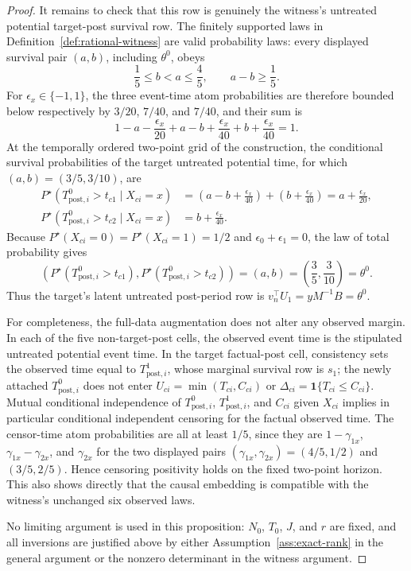 \documentclass{article}
\begin{document}
\begin{proof}
It remains to check that this row is genuinely the witness's untreated potential target-post survival row.  The finitely supported laws in Definition~\ref{def:rational-witness} are valid probability laws: every displayed survival pair \((a,b)\), including \(\theta^0\), obeys
\[
\frac15\le b<a\le\frac45,
\qquad a-b\ge\frac15.
\]
For \(\epsilon_x\in\{-1,1\}\), the three event-time atom probabilities are therefore bounded below respectively by \(3/20\), \(7/40\), and \(7/40\), and their sum is
\[
1-a-\frac{\epsilon_x}{20}
+a-b+\frac{\epsilon_x}{40}
+b+\frac{\epsilon_x}{40}=1.
\]
At the temporally ordered two-point grid of the construction, the conditional survival probabilities of the target untreated potential time, for which \((a,b)=(3/5,3/10)\), are
\[
\begin{aligned}
P^\star\!\left(T^0_{\mathrm{post},i}>t_{c1}\mid X_{ci}=x\right)
&=\left(a-b+\frac{\epsilon_x}{40}\right)
+\left(b+\frac{\epsilon_x}{40}\right)
=a+\frac{\epsilon_x}{20},\\
P^\star\!\left(T^0_{\mathrm{post},i}>t_{c2}\mid X_{ci}=x\right)
&=b+\frac{\epsilon_x}{40}.
\end{aligned}
\]
Because \(P^\star(X_{ci}=0)=P^\star(X_{ci}=1)=1/2\) and \(\epsilon_0+\epsilon_1=0\), the law of total probability gives
\[
\left(
P^\star(T^0_{\mathrm{post},i}>t_{c1}),
P^\star(T^0_{\mathrm{post},i}>t_{c2})
\right)
=(a,b)
=\left(\frac35,\frac3{10}\right)
=\theta^0.
\]
Thus the target's latent untreated post-period row is \(v_n^\top U_1=yM^{-1}B=\theta^0\).

For completeness, the full-data augmentation does not alter any observed margin.  In each of the five non-target-post cells, the observed event time is the stipulated untreated potential event time.  In the target factual-post cell, consistency sets the observed time equal to \(T^1_{\mathrm{post},i}\), whose marginal survival row is \(s_1\); the newly attached \(T^0_{\mathrm{post},i}\) does not enter \(U_{ci}=\min(T_{ci},C_{ci})\) or \(\Delta_{ci}=\mathbf 1\{T_{ci}\le C_{ci}\}\).  Mutual conditional independence of \(T^0_{\mathrm{post},i}\), \(T^1_{\mathrm{post},i}\), and \(C_{ci}\) given \(X_{ci}\) implies in particular conditional independent censoring for the factual observed time.  The censor-time atom probabilities are all at least \(1/5\), since they are \(1-\gamma_{1x}\), \(\gamma_{1x}-\gamma_{2x}\), and \(\gamma_{2x}\) for the two displayed pairs \((\gamma_{1x},\gamma_{2x})=(4/5,1/2)\) and \((3/5,2/5)\).  Hence censoring positivity holds on the fixed two-point horizon.  This also shows directly that the causal embedding is compatible with the witness's unchanged six observed laws.

No limiting argument is used in this proposition: \(N_0\), \(T_0\), \(J\), and \(r\) are fixed, and all inversions are justified above by either Assumption~\ref{ass:exact-rank} in the general argument or the nonzero determinant in the witness argument.
\end{proof}
\end{document}
